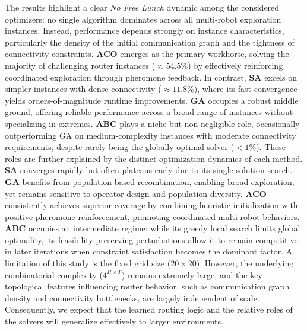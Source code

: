 \documentclass[conference]{IEEEtran}
\begin{document}
The results highlight a clear \emph{No Free Lunch} dynamic among the considered
optimizers: no single algorithm dominates across all multi-robot exploration
instances. Instead, performance depends strongly on instance characteristics,
particularly the density of the initial communication graph and the tightness of
connectivity constraints. \textbf{ACO} emerges as the primary workhorse, solving the
majority of challenging router instances ($\approx 54.5\%$) by effectively
reinforcing coordinated exploration through pheromone feedback. In contrast, \textbf{SA}
excels on simpler instances with dense connectivity ($\approx 11.8\%$), where its
fast convergence yields orders-of-magnitude runtime improvements. \textbf{GA} occupies a
robust middle ground, offering reliable performance across a broad range of
instances without specializing in extremes. \textbf{ABC} plays a niche but non-negligible
role, occasionally outperforming GA on medium-complexity instances with moderate
connectivity requirements, despite rarely being the globally optimal solver
($<1\%$).
These roles are further explained by the distinct optimization dynamics of each
method. \textbf{SA} converges rapidly but often plateaus early due to its single-solution
search. \textbf{GA} benefits from population-based recombination, enabling broad
exploration, yet remains sensitive to operator design and population diversity.
\textbf{ACO} consistently achieves superior coverage by combining heuristic initialization
with positive pheromone reinforcement, promoting coordinated multi-robot
behaviors. \textbf{ABC} occupies an intermediate regime: while its greedy local search
limits global optimality, its feasibility-preserving perturbations allow it to
remain competitive in later iterations when constraint satisfaction becomes the
dominant factor.
A limitation of this study is the fixed grid size ($20 \times 20$). However, the underlying combinatorial complexity ($4^{R \times T}$) remains extremely large, and the key topological features influencing router behavior, such as communication graph density and connectivity bottlenecks, are largely independent of scale. Consequently, we expect that the learned routing logic and the relative roles of the solvers will generalize effectively to larger environments.
\end{document}
